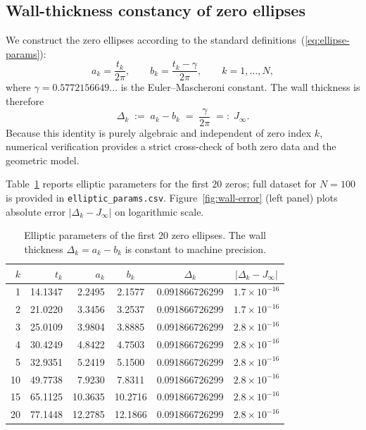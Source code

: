 \documentclass[10pt,reqno]{article}
\newcommand{\gammaconst}{\gamma}
\newcommand{\Jinf}{J_\infty}
\newcommand{\azero}{a_k}
\newcommand{\bzero}{b_k}
\begin{document}
\subsection{Wall-thickness constancy of zero ellipses}
\label{subsec:wall-thickness-num}

We construct the zero ellipses according to the standard definitions~(\ref{eq:ellipse-params}):
\[
\azero = \frac{t_k}{2\pi}, \qquad 
\bzero = \frac{t_k-\gammaconst}{2\pi}, \qquad k=1,\dots,N,
\]
where $\gammaconst=0.5772156649\ldots$ is the Euler--Mascheroni constant. The wall thickness is therefore
\[
\Delta_k \;:=\; \azero - \bzero \;=\;
\frac{\gammaconst}{2\pi} \;=:\; \Jinf.
\]
Because this identity is purely algebraic and independent of zero index $k$, numerical verification provides a strict cross-check of both zero data and the geometric model.

Table~\ref{tab:wall-thickness} reports elliptic parameters for the first $20$ zeros; full dataset for $N=100$ is provided in \texttt{elliptic\_params.csv}. Figure~\ref{fig:wall-error} (left panel) plots absolute error $|\Delta_k-\Jinf|$ on logarithmic scale.

\begin{table}[htbp]
\centering
\caption{Elliptic parameters of the first $20$ zero ellipses. The wall thickness $\Delta_k=\azero-\bzero$ is constant to machine precision.}
\label{tab:wall-thickness}
\begin{tabular}{@{}rrrccc@{}}
\toprule
$k$ & $t_k$ & $\azero$ & $\bzero$ & $\Delta_k$ & $|\Delta_k-\Jinf|$ \\
\midrule
 1 & 14.1347 & 2.2495 & 2.1577 & 0.091866726299 & $1.7\times10^{-16}$ \\
 2 & 21.0220 & 3.3456 & 3.2537 & 0.091866726299 & $1.7\times10^{-16}$ \\
 3 & 25.0109 & 3.9804 & 3.8885 & 0.091866726299 & $2.8\times10^{-16}$ \\
 4 & 30.4249 & 4.8422 & 4.7503 & 0.091866726299 & $2.8\times10^{-16}$ \\
 5 & 32.9351 & 5.2419 & 5.1500 & 0.091866726299 & $2.8\times10^{-16}$ \\
10 & 49.7738 & 7.9230 & 7.8311 & 0.091866726299 & $2.8\times10^{-16}$ \\
15 & 65.1125 & 10.3635 & 10.2716 & 0.091866726299 & $2.8\times10^{-16}$ \\
20 & 77.1448 & 12.2785 & 12.1866 & 0.091866726299 & $2.8\times10^{-16}$ \\
\bottomrule
\end{tabular}
\end{table}
\end{document}
